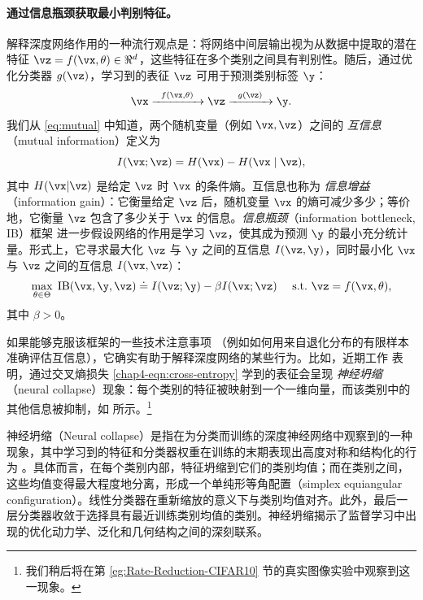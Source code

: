 \documentclass[../../book-main_zh.tex]{subfiles}
\begin{document}
\paragraph{通过信息瓶颈获取最小判别特征。}
解释深度网络作用的一种流行观点是：将网络中间层输出视为从数据中提取的潜在特征 $\vz = f(\vx, \theta) \in \Re^d$，这些特征在多个类别之间具有判别性。随后，通过优化分类器 $g(\vz)$，学习到的表征 $\vz$ 可用于预测类别标签 $\y$：
\begin{equation}
    \vx   \xrightarrow{\hspace{2mm} f(\vx, \theta)\hspace{2mm}} \vz
    \xrightarrow{\hspace{2mm} g(\vz) \hspace{2mm}} \y.
\end{equation}
我们从 \eqref{eq:mutual} 中知道，两个随机变量（例如 $\vx,\vz$）之间的 {\em 互信息}（mutual information）定义为
\begin{equation}
    I(\vx; \vz) = H(\vx) - H(\vx\mid \vz),
\end{equation}
其中 $H(\vx \vert \vz)$ 是给定 $\vz$ 时 $\vx$ 的条件熵。互信息也称为 {\em 信息增益}（information gain）：它衡量给定 $\vz$ 后，随机变量 $\vx$ 的熵可减少多少；等价地，它衡量 $\vz$ 包含了多少关于 $\vx$ 的信息。{\em 信息瓶颈}（information bottleneck, IB）框架 \cite{Tishby-ITW2015} 进一步假设网络的作用是学习 $\vz$，使其成为预测 $\y$ 的最小充分统计量。形式上，它寻求最大化 $\vz$ 与 $\y$ 之间的互信息 $I(\vz, \y)$，同时最小化 $\vx$ 与 $\vz$ 之间的互信息 $I(\vx, \vz)$：
\begin{equation}
    \max_{\theta\in \Theta}\; \mbox{IB}(\vx, \y, \vz) \doteq I(\vz; \y) -
    \beta I(\vx; \vz) \quad\ \mathrm{s.t.}\ \vz = f(\vx, \theta),
    \label{chap4-eqn:information-bottleneck}
\end{equation}
其中 $\beta >0$。

如果能够克服该框架的一些技术注意事项 \cite{kolchinsky2018caveats-ICLR2018}（例如如何用来自退化分布的有限样本准确评估互信息），它确实有助于解释深度网络的某些行为。比如，近期工作 \cite{papyan2020prevalence} 表明，通过交叉熵损失 \eqref{chap4-eqn:cross-entropy} 学到的表征会呈现 \emph{神经坍缩}（neural collapse）现象：每个类别的特征被映射到一个一维向量，而该类别中的其他信息被抑制，如  所示。\footnote{我们稍后将在第 \ref{eg:Rate-Reduction-CIFAR10} 节的真实图像实验中观察到这一现象。}
\begin{remark}[神经坍缩]
    神经坍缩（Neural collapse）是指在为分类而训练的深度神经网络中观察到的一种现象，其中学习到的特征和分类器权重在训练的末期表现出高度对称和结构化的行为 \cite{papyan2020prevalence,zhu2021geometric,yaras2022neural}。具体而言，在每个类别内部，特征坍缩到它们的类别均值；而在类别之间，这些均值变得最大程度地分离，形成一个单纯形等角配置（simplex equiangular configuration）。线性分类器在重新缩放的意义下与类别均值对齐。此外，最后一层分类器收敛于选择具有最近训练类别均值的类别。神经坍缩揭示了监督学习中出现的优化动力学、泛化和几何结构之间的深刻联系。
    \label{remark:neural-collapse}
\end{remark}
\end{document}
